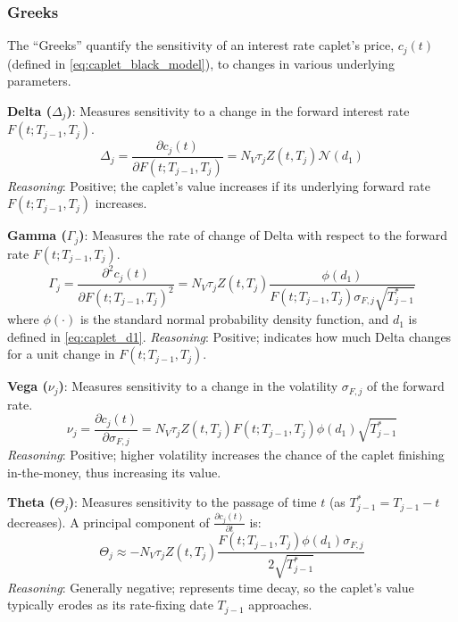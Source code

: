 \documentclass[11pt, a4paper, british]{article}
\begin{document}
\subsubsection{Greeks}
The ``Greeks'' quantify the sensitivity of an interest rate caplet's price, $c_j(t)$ (defined in \eqref{eq:caplet_black_model}), to changes in various underlying parameters.

\textbf{Delta ($\Delta_j$)}: Measures sensitivity to a change in the forward interest rate $F(t; T_{j-1}, T_j)$.
\begin{equation}
    \Delta_j = \frac{\partial c_j(t)}{\partial F(t; T_{j-1}, T_j)} = N_V \tau_j Z(t, T_j) \mathcal{N}(d_1)
    \label{eq:caplet_delta_revised}
\end{equation}
\textit{Reasoning}: Positive; the caplet's value increases if its underlying forward rate $F(t; T_{j-1}, T_j)$ increases.

\textbf{Gamma ($\Gamma_j$)}: Measures the rate of change of Delta with respect to the forward rate $F(t; T_{j-1}, T_j)$.
\begin{equation}
    \Gamma_j = \frac{\partial^2 c_j(t)}{\partial F(t; T_{j-1}, T_j)^2} = N_V \tau_j Z(t, T_j) \frac{\phi(d_1)}{F(t; T_{j-1}, T_j) \sigma_{F,j} \sqrt{T_{j-1}^*}}
    \label{eq:caplet_gamma_revised}
\end{equation}
where $\phi(\cdot)$ is the standard normal probability density function, and $d_1$ is defined in \eqref{eq:caplet_d1}.
\textit{Reasoning}: Positive; indicates how much Delta changes for a unit change in $F(t; T_{j-1}, T_j)$.

\textbf{Vega ($\nu_j$)}: Measures sensitivity to a change in the volatility $\sigma_{F,j}$ of the forward rate.
\begin{equation}
    \nu_j = \frac{\partial c_j(t)}{\partial \sigma_{F,j}} = N_V \tau_j Z(t, T_j) F(t; T_{j-1}, T_j) \phi(d_1) \sqrt{T_{j-1}^*}
    \label{eq:caplet_vega_revised}
\end{equation}
\textit{Reasoning}: Positive; higher volatility increases the chance of the caplet finishing in-the-money, thus increasing its value.

\textbf{Theta ($\Theta_j$)}: Measures sensitivity to the passage of time $t$ (as $T_{j-1}^* = T_{j-1}-t$ decreases). A principal component of $\frac{\partial c_j(t)}{\partial t}$ is:
\begin{equation}
    \Theta_j \approx -N_V \tau_j Z(t, T_j) \frac{F(t; T_{j-1}, T_j) \phi(d_1)\sigma_{F,j}}{2\sqrt{T_{j-1}^*}}
    \label{eq:caplet_theta_revised}
\end{equation}
\textit{Reasoning}: Generally negative; represents time decay, so the caplet's value typically erodes as its rate-fixing date $T_{j-1}$ approaches.
\end{document}
